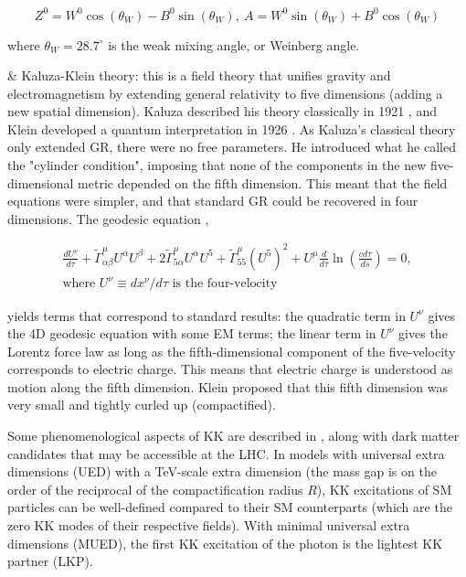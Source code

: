 \begin{easylist}[itemize]
\begin{equation}
Z^0 = W^0\cos(\theta_W) - B^0\sin(\theta_W), \ 
A = W^0\sin(\theta_W) + B^0\cos(\theta_W)
\end{equation}

where $\theta_W = 28.7^{\circ}$ is the weak mixing angle, or Weinberg angle. \cite{tagkey1984quarksandleptons}

& Kaluza-Klein theory: this is a field theory that unifies gravity and electromagnetism by extending general relativity to five dimensions (adding a new spatial dimension). Kaluza described his theory classically in 1921 \cite{Kaluza1921}, and Klein developed a quantum interpretation in 1926 \cite{1926ZPhy37895K}. As Kaluza's classical theory only extended GR, there were no free parameters. He introduced what he called the "cylinder condition", imposing that none of the components in the new five-dimensional metric depended on the fifth dimension. This meant that the field equations were simpler, and that standard GR could be recovered in four dimensions. The geodesic equation \cite{2012AstRv7b5W},

\begin{multline}
\frac{ dU^{\nu} }{ d\tau } + \tilde{\Gamma}^{\mu}_{\alpha\beta} U^{\alpha}U^{\beta} + 2 \tilde{\Gamma}^{\mu}_{5\alpha}U^{\alpha}U^5 + \tilde{\Gamma}^{\mu}_{55} (U^5)^2 + U^{\mu} \frac{ d }{ d\tau } \ln \left( \frac{ cd\tau }{ ds } \right) = 0, \\ \textrm{where $U^{\nu} \equiv dx^{\nu} / d\tau$ is the four-velocity}
\end{multline}

yields terms that correspond to standard results: the quadratic term in $U^{\nu}$ gives the 4D geodesic equation with some EM terms; the linear term in $U^{\nu}$ gives the Lorentz force law as long as the fifth-dimensional component of the five-velocity corresponds to electric charge. This means that electric charge is understood as motion along the fifth dimension. Klein proposed that this fifth dimension was very small and tightly curled up (compactified).

Some phenomenological aspects of KK are described in \cite{Flacke:2017xsv}, along with dark matter candidates that may be accessible at the LHC. In models with universal extra dimensions (UED) with a TeV-scale extra dimension (the mass gap is on the order of the reciprocal of the compactification radius $R$), KK excitations of SM particles can be well-defined compared to their SM counterparts (which are the zero KK modes of their respective fields). With minimal universal extra dimensions (MUED), the first KK excitation of the photon is the lightest KK partner (LKP).


\end{easylist}
